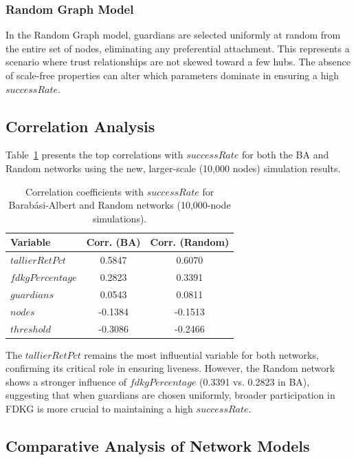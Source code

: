\documentclass[runningheads]{llncs}
\begin{document}
\subsubsection{Random Graph Model}
In the Random Graph model, guardians are selected uniformly at random from the entire set of nodes, eliminating any preferential attachment. This represents a scenario where trust relationships are not skewed toward a few hubs. The absence of scale-free properties can alter which parameters dominate in ensuring a high $successRate$.

\subsection{Correlation Analysis}

Table~\ref{tab:correlations_ba_random} presents the top correlations with $successRate$ for both the BA and Random networks using the new, larger-scale (10,000 nodes) simulation results.

\begin{table}[h]
\centering
\caption{Correlation coefficients with $successRate$ for Barabási-Albert and Random networks (10,000-node simulations).}
\label{tab:correlations_ba_random}
\begin{tabular}{lcc}
\toprule
\textbf{Variable} & \textbf{Corr. (BA)} & \textbf{Corr. (Random)} \\
\midrule
$tallierRetPct$   & 0.5847  & 0.6070 \\
$fdkgPercentage$  & 0.2823  & 0.3391 \\
$guardians$       & 0.0543  & 0.0811 \\
$nodes$           & -0.1384 & -0.1513 \\
$threshold$       & -0.3086 & -0.2466 \\
\bottomrule
\end{tabular}
\end{table}

\noindent The $tallierRetPct$ remains the most influential variable for both networks, confirming its critical role in ensuring liveness. However, the Random network shows a stronger influence of $fdkgPercentage$ (0.3391 vs. 0.2823 in BA), suggesting that when guardians are chosen uniformly, broader participation in FDKG is more crucial to maintaining a high $successRate$.

\subsection{Comparative Analysis of Network Models}
\end{document}
